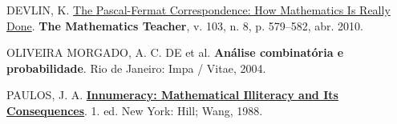 \documentclass[
  11pt]{report}
\newlength{\cslhangindent}
\newlength{\cslentryspacingunit} %
\newenvironment{CSLReferences}[2] %
 {%
  \setlength{\parindent}{0pt}
  \ifodd #1
  \let\oldpar\par
  \def\par{\hangindent=\cslhangindent\oldpar}
  \fi
  \setlength{\parskip}{#2\cslentryspacingunit}
 }%
 {}
\begin{document}
\hypertarget{refs}{}
\begin{CSLReferences}{0}{1}
\leavevmode{}%
DEVLIN, K. \href{https://doi.org/10.5951/mt.103.8.0579}{The {P}ascal-{F}ermat Correspondence: How Mathematics Is Really Done}. \textbf{The Mathematics Teacher}, v. 103, n. 8, p. 579--582, abr. 2010.

\leavevmode{}%
OLIVEIRA MORGADO, A. C. DE et al. \textbf{An{á}lise combinat{ó}ria e probabilidade}. Rio de Janeiro: Impa / Vitae, 2004.

\leavevmode{}%
PAULOS, J. A. \textbf{\href{http://gen.lib.rus.ec/book/index.php?md5=20A842C0E7EB7F8992EDDA0082E9B76F}{Innumeracy: Mathematical Illiteracy and Its Consequences}}. 1. ed. New York: Hill; Wang, 1988.

\end{CSLReferences}
\end{document}
